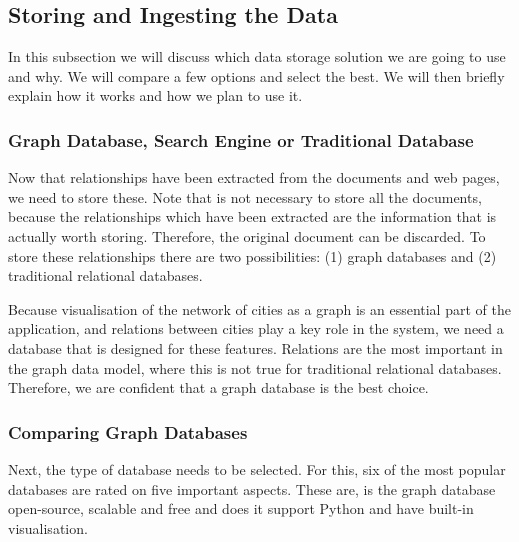 \subsection{Storing and Ingesting the Data}
In this subsection we will discuss which data storage solution we are going to use and why. We will compare a few options and select the best. We will then briefly explain how it works and how we plan to use it.

\subsubsection{Graph Database, Search Engine or Traditional Database}
Now that relationships have been extracted from the documents and web pages, we need to store these. Note that is not necessary to store all the documents, because the relationships which have been extracted are the information that is actually worth storing. Therefore, the original document can be discarded. To store these relationships there are two possibilities: (1) graph databases and (2) traditional relational databases.

Because visualisation of the network of cities as a graph is an essential part of the application, and relations between cities play a key role in the system, we need a database that is designed for these features. Relations are the most important in the graph data model, where this is not true for traditional relational databases. Therefore, we are confident that a graph database is the best choice.

\subsubsection{Comparing Graph Databases}
Next, the type of database needs to be selected. For this, six of the most popular databases are rated on five important aspects. These are, is the graph database open-source, scalable and free and does it support Python and have built-in visualisation.\\


